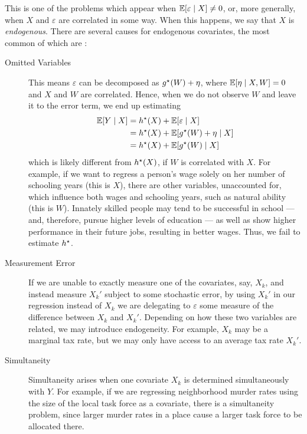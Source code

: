 This is one of the problems which appear when $ \mathbb{E} [ \varepsilon \mid X ] \neq 0 $, or, more generally, when $ X $ and $ \varepsilon $ are correlated in some way.
When this happens, we say that $ X $ is \emph{endogenous}.
There are several causes for endogenous covariates, the most common of  which are \cite{wooldridge2001}:
\begin{description}
    \item[Omitted Variables] This means $ \varepsilon $ can be decomposed as $ g^{ \star } ( W ) + \eta $, where $ \mathbb{E} [ \eta \mid X, W ] = 0 $ and $ X $ and $ W $ are correlated.
        Hence, when we do not observe $ W $ and leave it to the error term, we end up estimating
        \begin{align*}
            \mathbb{E} [ Y \mid X ]
            &= h^{ \star } ( X ) + \mathbb{E} [ \varepsilon \mid X ] \\
            &= h^{ \star } ( X ) + \mathbb{E} [ g^{ \star } ( W ) + \eta \mid X ] \\
            &= h^{ \star } ( X ) + \mathbb{E} [ g^{ \star } ( W ) \mid X ]
        \end{align*}
        which is likely different from $ h^{ \star } ( X ) $, if $ W $ is correlated with $ X $.
        For example, if we want to regress a person's wage solely on her number of schooling years (this is $ X $), there are other variables, unaccounted for, which influence both wages and schooling years, such as natural ability (this is $ W $).
        Innately skilled people may tend to be successful in school --- and, therefore, pursue higher levels of education --- as well as show higher performance in their future jobs, resulting in better wages.
        Thus, we fail to estimate $ h^{ \star } $.
    \item[Measurement Error] If we are unable to exactly measure one of the covariates, say, $ X_{ k } $, and instead measure $ X_{ k }' $ subject to some stochastic error, by using $ X_{ k }' $ in our regression instead of $ X_{ k } $ we are delegating to $ \varepsilon $ some measure of the difference between $ X_{ k } $ and $ X_{ k }' $.
        Depending on how these two variables are related, we may introduce endogeneity.
        For example, $ X_{ k } $ may be a marginal tax rate, but we may only have access to an average tax rate $ X_{ k }' $.
    \item[Simultaneity] Simultaneity arises when one covariate $ X_{ k } $ is determined simultaneously with $ Y $.
        For example, if we are regressing neighborhood murder rates using the size of the local task force as a covariate, there is a simultaneity problem, since larger murder rates in a place cause a larger task force to be allocated there.
\end{description}

